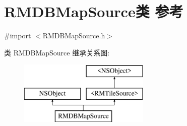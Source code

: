 \hypertarget{interface_r_m_d_b_map_source}{\section{R\-M\-D\-B\-Map\-Source类 参考}
\label{interface_r_m_d_b_map_source}
}


{\ttfamily \#import $<$R\-M\-D\-B\-Map\-Source.\-h$>$}

类 R\-M\-D\-B\-Map\-Source 继承关系图\-:\begin{figure}[H]
\begin{center}
\leavevmode
\includegraphics[height=3.000000cm]{interface_r_m_d_b_map_source}
\end{center}
\end{figure}
